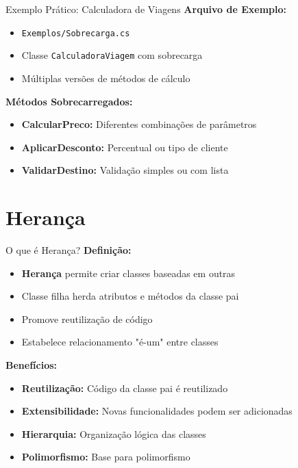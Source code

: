 \documentclass[aspectratio=169]{beamer}
\begin{document}
\begin{frame}{Exemplo Prático: Calculadora de Viagens}
\textbf{Arquivo de Exemplo:}
\begin{itemize}
    \item \texttt{Exemplos/Sobrecarga.cs}
    \item Classe \texttt{CalculadoraViagem} com sobrecarga
    \item Múltiplas versões de métodos de cálculo
\end{itemize}

\textbf{Métodos Sobrecarregados:}
\begin{itemize}
    \item \textbf{CalcularPreco:} Diferentes combinações de parâmetros
    \item \textbf{AplicarDesconto:} Percentual ou tipo de cliente
    \item \textbf{ValidarDestino:} Validação simples ou com lista
\end{itemize}
\end{frame}

\section{Herança}

\begin{frame}{O que é Herança?}
\textbf{Definição:}
\begin{itemize}
    \item \textbf{Herança} permite criar classes baseadas em outras
    \item Classe filha herda atributos e métodos da classe pai
    \item Promove reutilização de código
    \item Estabelece relacionamento "é-um" entre classes
\end{itemize}

\textbf{Benefícios:}
\begin{itemize}
    \item \textbf{Reutilização:} Código da classe pai é reutilizado
    \item \textbf{Extensibilidade:} Novas funcionalidades podem ser adicionadas
    \item \textbf{Hierarquia:} Organização lógica das classes
    \item \textbf{Polimorfismo:} Base para polimorfismo
\end{itemize}
\end{frame}
\end{document}
